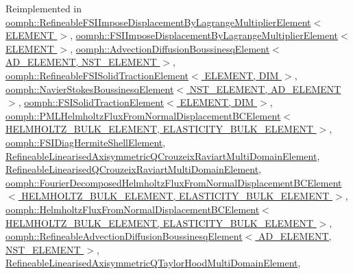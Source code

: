 Reimplemented in \hyperlink{classoomph_1_1RefineableFSIImposeDisplacementByLagrangeMultiplierElement_a3c86bf6884cd7cfdfa8e7381fbd16fcf}{oomph\+::\+Refineable\+F\+S\+I\+Impose\+Displacement\+By\+Lagrange\+Multiplier\+Element$<$ E\+L\+E\+M\+E\+N\+T $>$}, \hyperlink{classoomph_1_1FSIImposeDisplacementByLagrangeMultiplierElement_a48006d22e0ad79703914c687390150b8}{oomph\+::\+F\+S\+I\+Impose\+Displacement\+By\+Lagrange\+Multiplier\+Element$<$ E\+L\+E\+M\+E\+N\+T $>$}, \hyperlink{classoomph_1_1AdvectionDiffusionBoussinesqElement_afc63db5ad4e397df7809447ee3ca56ac}{oomph\+::\+Advection\+Diffusion\+Boussinesq\+Element$<$ A\+D\+\_\+\+E\+L\+E\+M\+E\+N\+T, N\+S\+T\+\_\+\+E\+L\+E\+M\+E\+N\+T $>$}, \hyperlink{classoomph_1_1RefineableFSISolidTractionElement_a886a6bcb5722c9535f6f78ccefdc0646}{oomph\+::\+Refineable\+F\+S\+I\+Solid\+Traction\+Element$<$ E\+L\+E\+M\+E\+N\+T, D\+I\+M $>$}, \hyperlink{classoomph_1_1NavierStokesBoussinesqElement_a01483469b070309aeb8948273b974feb}{oomph\+::\+Navier\+Stokes\+Boussinesq\+Element$<$ N\+S\+T\+\_\+\+E\+L\+E\+M\+E\+N\+T, A\+D\+\_\+\+E\+L\+E\+M\+E\+N\+T $>$}, \hyperlink{classoomph_1_1FSISolidTractionElement_a789bdb99ca30e3c7b56adab5be79a59d}{oomph\+::\+F\+S\+I\+Solid\+Traction\+Element$<$ E\+L\+E\+M\+E\+N\+T, D\+I\+M $>$}, \hyperlink{classoomph_1_1PMLHelmholtzFluxFromNormalDisplacementBCElement_a159c7c508fc565f7d70481cd467a5152}{oomph\+::\+P\+M\+L\+Helmholtz\+Flux\+From\+Normal\+Displacement\+B\+C\+Element$<$ H\+E\+L\+M\+H\+O\+L\+T\+Z\+\_\+\+B\+U\+L\+K\+\_\+\+E\+L\+E\+M\+E\+N\+T, E\+L\+A\+S\+T\+I\+C\+I\+T\+Y\+\_\+\+B\+U\+L\+K\+\_\+\+E\+L\+E\+M\+E\+N\+T $>$}, \hyperlink{classoomph_1_1FSIDiagHermiteShellElement_a5e48d1c0291cf16cacaa8b42112efe90}{oomph\+::\+F\+S\+I\+Diag\+Hermite\+Shell\+Element}, \hyperlink{classRefineableLinearisedAxisymmetricQCrouzeixRaviartMultiDomainElement_a5040c64ce7752b950ee33fa18e8eb7c1}{Refineable\+Linearised\+Axisymmetric\+Q\+Crouzeix\+Raviart\+Multi\+Domain\+Element}, \hyperlink{classRefineableLinearisedQCrouzeixRaviartMultiDomainElement_a0ee5de787e1dfe477236eef98fc46092}{Refineable\+Linearised\+Q\+Crouzeix\+Raviart\+Multi\+Domain\+Element}, \hyperlink{classoomph_1_1FourierDecomposedHelmholtzFluxFromNormalDisplacementBCElement_a721d81ba5e0e9c8d811303e7a9ce5a8a}{oomph\+::\+Fourier\+Decomposed\+Helmholtz\+Flux\+From\+Normal\+Displacement\+B\+C\+Element$<$ H\+E\+L\+M\+H\+O\+L\+T\+Z\+\_\+\+B\+U\+L\+K\+\_\+\+E\+L\+E\+M\+E\+N\+T, E\+L\+A\+S\+T\+I\+C\+I\+T\+Y\+\_\+\+B\+U\+L\+K\+\_\+\+E\+L\+E\+M\+E\+N\+T $>$}, \hyperlink{classoomph_1_1HelmholtzFluxFromNormalDisplacementBCElement_a5e10f6e632c05ce464548f51c8381b43}{oomph\+::\+Helmholtz\+Flux\+From\+Normal\+Displacement\+B\+C\+Element$<$ H\+E\+L\+M\+H\+O\+L\+T\+Z\+\_\+\+B\+U\+L\+K\+\_\+\+E\+L\+E\+M\+E\+N\+T, E\+L\+A\+S\+T\+I\+C\+I\+T\+Y\+\_\+\+B\+U\+L\+K\+\_\+\+E\+L\+E\+M\+E\+N\+T $>$}, \hyperlink{classoomph_1_1RefineableAdvectionDiffusionBoussinesqElement_a89bbdff66fd1fe24f4ae1d681a88d583}{oomph\+::\+Refineable\+Advection\+Diffusion\+Boussinesq\+Element$<$ A\+D\+\_\+\+E\+L\+E\+M\+E\+N\+T, N\+S\+T\+\_\+\+E\+L\+E\+M\+E\+N\+T $>$}, \hyperlink{classRefineableLinearisedAxisymmetricQTaylorHoodMultiDomainElement_a057d824e17f4e7ed12b496629dfe67fd}{Refineable\+Linearised\+Axisymmetric\+Q\+Taylor\+Hood\+Multi\+Domain\+Element}, 